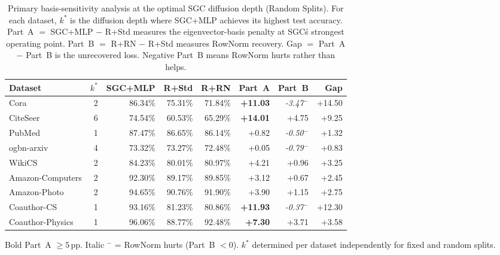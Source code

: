 \begin{table}[t]
\centering\small\setlength{\tabcolsep}{5pt}
\caption{Primary basis-sensitivity analysis at the optimal SGC diffusion depth (Random Splits). For each dataset, $k^*$ is the diffusion depth where SGC+MLP achieves its highest test accuracy. Part~A $=$ SGC+MLP $-$ R+Std measures the eigenvector-basis penalty at SGC\'s strongest operating point. Part~B $=$ R+RN $-$ R+Std measures RowNorm recovery. Gap $=$ Part~A $-$ Part~B is the unrecovered loss. Negative Part~B means RowNorm hurts rather than helps.}
\label{tab:primary_analysis_random}
\begin{tabular}{lrrrrrrr}
\toprule
Dataset & $k^*$ & SGC+MLP & R+Std & R+RN & Part~A & Part~B & Gap \\
\midrule
Cora                 &   2 & 86.34\% & 75.31\% & 71.84\% & \textbf{+11.03} & \textit{-3.47}$^-$ & +14.50 \\
CiteSeer             &   6 & 74.54\% & 60.53\% & 65.29\% & \textbf{+14.01} & +4.75 & +9.25 \\
PubMed               &   1 & 87.47\% & 86.65\% & 86.14\% & +0.82 & \textit{-0.50}$^-$ & +1.32 \\
ogbn-arxiv           &   4 & 73.32\% & 73.27\% & 72.48\% & +0.05 & \textit{-0.79}$^-$ & +0.83 \\
WikiCS               &   2 & 84.23\% & 80.01\% & 80.97\% & +4.21 & +0.96 & +3.25 \\
Amazon-Computers     &   2 & 92.30\% & 89.17\% & 89.85\% & +3.12 & +0.67 & +2.45 \\
Amazon-Photo         &   2 & 94.65\% & 90.76\% & 91.90\% & +3.90 & +1.15 & +2.75 \\
Coauthor-CS          &   1 & 93.16\% & 81.23\% & 80.86\% & \textbf{+11.93} & \textit{-0.37}$^-$ & +12.30 \\
Coauthor-Physics     &   1 & 96.06\% & 88.77\% & 92.48\% & \textbf{+7.30} & +3.71 & +3.58 \\
\bottomrule
\end{tabular}
\begin{tablenotes}\small
\item Bold Part~A $\geq 5$\,pp. Italic $^-$ = RowNorm hurts (Part~B $< 0$). $k^*$ determined per dataset independently for fixed and random splits.
\end{tablenotes}
\end{table}
